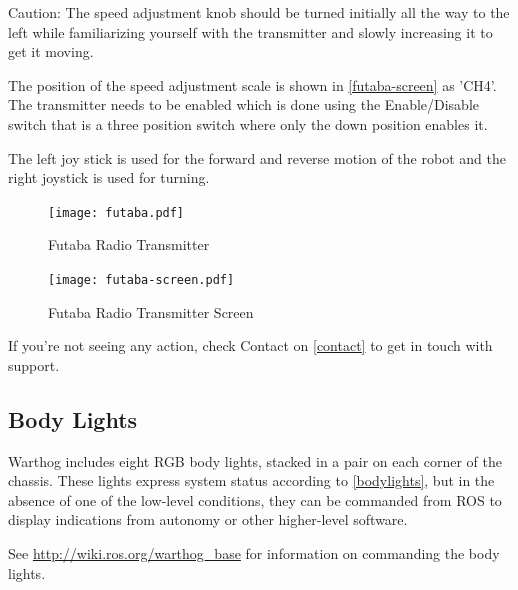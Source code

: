 \documentclass[]{clearpath-latex/clearpath-manual}
\begin{document}
\begin{warning}[]
Caution: The speed adjustment knob should be turned initially all the way to the left while familiarizing yourself with the transmitter and slowly increasing it to get it moving.
\end{warning}

The position of the speed adjustment scale is shown in  \autoref{futaba-screen} as 'CH4'.
The transmitter needs to be enabled which is done using the Enable/Disable switch that is a three position switch where only the down position enables it.

The left joy stick is used for the forward and reverse motion of the robot and the right joystick is used for turning.



\begin{figure}[!h]
  \centering
  \texttt{[image: futaba.pdf]}
  \caption{Futaba Radio Transmitter}
  \label{futaba}
\end{figure}

\begin{figure}[!h]
  \centering
  \texttt{[image: futaba-screen.pdf]}
  \caption{Futaba Radio Transmitter Screen}
  \label{futaba-screen}
\end{figure}

If you’re not seeing any action, check Contact on \autoref{contact} to get in touch with support.


\pagebreak[4]
\iffalse
\subsection{Body Lights}

Warthog includes eight RGB body lights, stacked in a pair on each corner of the chassis. These lights express system status according to \autoref{bodylights}, but in the absence of one of the low-level conditions, they can be commanded from ROS to display indications from autonomy or other higher-level software.

See \url{http://wiki.ros.org/warthog_base} for information on commanding the body lights.
\end{document}
